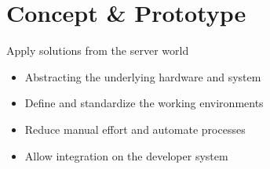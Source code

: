 \documentclass{beamer}
\begin{document}
\section{Concept \& Prototype}
\begin{frame}{}
  \begin{center}
    \Large Apply solutions from the server world
  \end{center}
  \vspace{.8cm}
  \begin{itemize}
    \setlength\itemsep{1.2em}
    \large
    \item Abstracting the underlying hardware and system
    \item Define and standardize the working environments
    \item Reduce manual effort and automate processes
    \item Allow integration on the developer system
  \end{itemize}
\end{frame}
\end{document}
